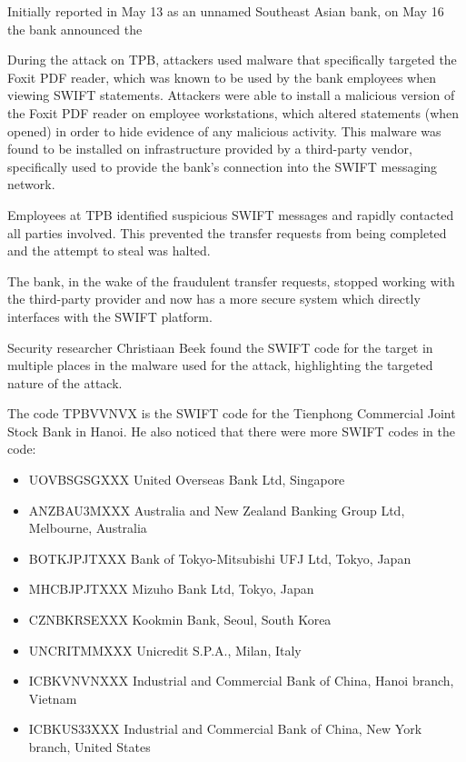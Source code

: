 \documentclass[12pt]{article}
\begin{document}
        Initially reported in May 13 as an unnamed Southeast Asian bank, on May 16 the bank announced the 
        
        During the attack on TPB, attackers used malware that specifically targeted the Foxit PDF reader, which was known to be used by the bank employees when viewing SWIFT statements. Attackers were able to install a malicious version of the Foxit PDF reader on employee workstations, which altered statements (when opened) in order to hide evidence of any malicious activity. This malware was found to be installed on infrastructure provided by a third-party vendor, specifically used to provide the bank’s connection into the SWIFT messaging network. 
        
        Employees at TPB identified suspicious SWIFT messages and rapidly contacted all parties involved. This prevented the transfer requests from being completed and the attempt to steal was halted.
        
        The bank, in the wake of the fraudulent transfer requests, stopped working with the third-party provider and now has a more secure system which directly interfaces with the SWIFT platform.

        Security researcher Christiaan Beek found the SWIFT code for the target in multiple places in the malware used for the attack, highlighting the targeted nature of the attack.  
        
        The code TPBVVNVX is the SWIFT code for the Tienphong Commercial Joint Stock Bank in Hanoi. He also noticed that there were more SWIFT codes in the code:
        \begin{itemize}
            \item UOVBSGSGXXX United Overseas Bank Ltd, Singapore
            \item ANZBAU3MXXX Australia and New Zealand Banking Group Ltd, Melbourne, Australia
            \item BOTKJPJTXXX Bank of Tokyo-Mitsubishi UFJ Ltd, Tokyo, Japan
            \item MHCBJPJTXXX Mizuho Bank Ltd, Tokyo, Japan
            \item CZNBKRSEXXX Kookmin Bank, Seoul, South Korea
            \item UNCRITMMXXX Unicredit S.P.A., Milan, Italy
            \item ICBKVNVNXXX Industrial and Commercial Bank of China, Hanoi branch, Vietnam
            \item ICBKUS33XXX Industrial and Commercial Bank of China, New York branch, United States
        \end{itemize}
       
\end{document}
